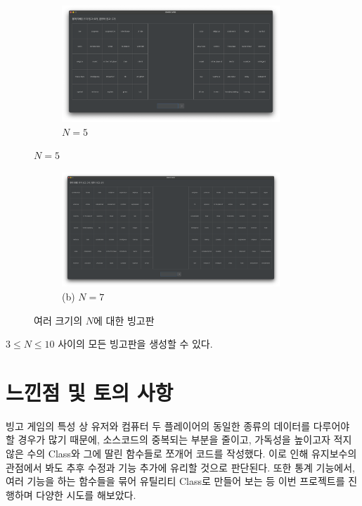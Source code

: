 \newpage
\begin{figure}[H]
    \begin{subfigure}{\textwidth}
        \centering
        \includegraphics[width=0.9\textwidth]{img/game-5x5.png}
        \caption{$N = 5$}
    \end{subfigure}
\end{figure}
\newpage
\setcounter{figure}{7}
\begin{figure}[H]
    \begin{subfigure}{\textwidth}
        \centering
        \includegraphics[width=0.9\textwidth]{img/game-7x7.png}\\
        (b) $N = 7$
    \end{subfigure}
    \caption{여러 크기의 $N$에 대한 빙고판}
\end{figure}
$3 \leq N \leq 10$ 사이의 모든 빙고판을 생성할 수 있다.

\newpage
\section{느낀점 및 토의 사항}
빙고 게임의 특성 상 유저와 컴퓨터 두 플레이어의 동일한 종류의 데이터를 다루어야 할 경우가 많기 때문에,
소스코드의 중복되는 부분을 줄이고, 가독성을 높이고자 적지 않은 수의 Class와 그에 딸린 함수들로 쪼개어 코드를 작성했다.
이로 인해 유지보수의 관점에서 봐도 추후 수정과 기능 추가에 유리할 것으로 판단된다.
또한 통계 기능에서, 여러 기능을 하는 함수들을 묶어 유틸리티 Class로 만들어 보는 등 이번 프로젝트를 진행하며 다양한 시도를 해보았다.

